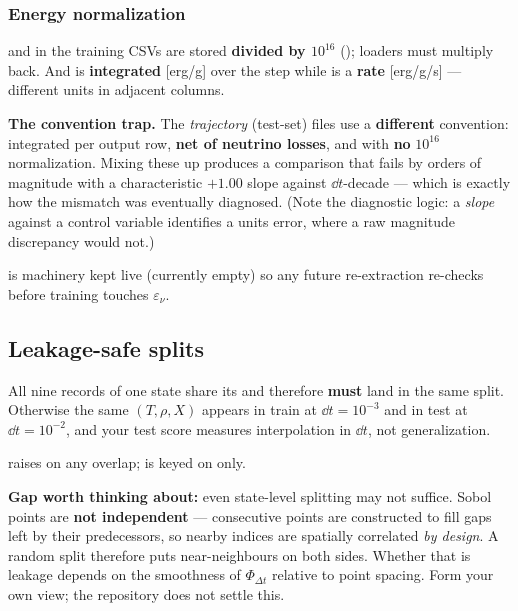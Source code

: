 \subsubsection{Energy normalization}
\label{sec:energynorm}

 and  in the training CSVs are stored
\textbf{divided by $10^{16}$} (); loaders must multiply
back. And  is \textbf{integrated} [erg/g] over the step while
 is a \textbf{rate} [erg/g/s] --- different units in adjacent
columns.

\textbf{The convention trap.} The \emph{trajectory} (test-set) files use a
\textbf{different} convention: integrated per output row, \textbf{net of
neutrino losses}, and with \textbf{no} $10^{16}$ normalization. Mixing these up
produces a comparison that fails by orders of magnitude with a characteristic
$+1.00$ slope against $\dd t$-decade --- which is exactly how the mismatch was
eventually diagnosed. (Note the diagnostic logic: a \emph{slope} against a
control variable identifies a units error, where a raw magnitude discrepancy
would not.)

 is machinery kept live (currently empty) so any
future re-extraction re-checks before training touches $\varepsilon_\nu$.

\subsection{Leakage-safe splits}
\label{sec:splits}

All nine records of one state share its  and therefore
\textbf{must} land in the same split. Otherwise the same $(T, \rho, X)$ appears
in train at $\dd t = 10^{-3}$ and in test at $\dd t = 10^{-2}$, and your test
score measures interpolation in $\dd t$, not generalization.

 raises on any overlap;  is keyed on
 only.

\textbf{Gap worth thinking about:} even state-level splitting may not suffice.
Sobol points are \textbf{not independent} --- consecutive points are constructed
to fill gaps left by their predecessors, so nearby indices are spatially
correlated \emph{by design}. A random  split therefore puts
near-neighbours on both sides. Whether that is leakage depends on the smoothness
of $\Phi_{\Delta t}$ relative to point spacing. Form your own view; the
repository does not settle this.

